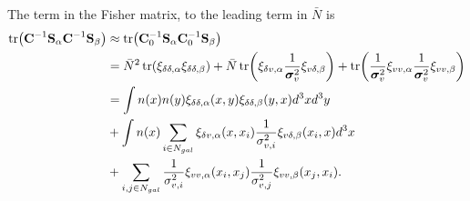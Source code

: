 \documentclass{article}
\begin{document}
The term in the Fisher matrix, to the leading term in $\bar{N}$ is
\begin{align}
 \tr(\textbf{C}^{-1} \textbf{S}_\alpha \textbf{C}^{-1} \textbf{S}_\beta) & \approx  \tr(\textbf{C}_0^{-1} \textbf{S}_\alpha \textbf{C}_0^{-1} \textbf{S}_\beta)  \\
 & = \bar{N}^2 \tr(\xi_{\delta \delta,\alpha}\xi_{\delta \delta,\beta})+
 \bar{N} \tr(\xi_{\delta v,\alpha} \frac{1}{\bm{\sigma}^2_v} \xi_{v\delta,\beta} ) + \tr(\frac{1}{\bm{\sigma}^2_v} \xi_{vv,\alpha}  \frac{1}{\bm{\sigma}^2_v}  \xi_{vv,\beta})\\
 & = \int n(x) n(y) \xi_{\delta \delta,\alpha}(x,y)\xi_{\delta \delta,\beta}(y,x) d^3x d^3y \\
 & + \int n(x) \sum_{i\in N_{gal}} \xi_{\delta v,\alpha}(x,x_i) \frac{1}{\sigma^2_{v,i}} \xi_{v\delta,\beta} (x_i,x) d^3x \\
 & +  \sum_{i,j\in N_{gal}} \frac{1}{\sigma^2_{v,i}} \xi_{vv,\alpha}(x_i,x_j)  \frac{1}{\sigma^2_{v,j}}  \xi_{vv,\beta}(x_j,x_i).
\end{align}
\end{document}
